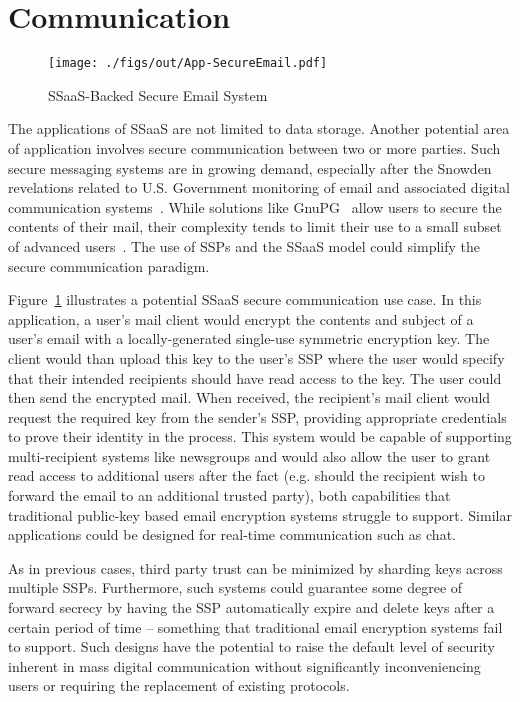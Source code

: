 \section{Communication}

\begin{figure}[t]
  \centering
  \texttt{[image: ./figs/out/App-SecureEmail.pdf]}
  \caption{SSaaS-Backed Secure Email System}
  \label{fig:apps-secureemail}
\end{figure}

The applications of SSaaS are not limited to data storage. Another
potential area of application involves secure communication between
two or more parties. Such secure messaging systems are in growing
demand, especially after the Snowden revelations related to U.S.
Government monitoring of email and associated digital communication
systems~\cite{gellman-muscular, greenwald-collect,
  greenwald-prism}. While solutions like GnuPG~\cite{gnupg} allow
users to secure the contents of their mail, their complexity tends to
limit their use to a small subset of advanced
users~\cite{green-challenge, whitten1999}. The use of SSPs and the
SSaaS model could simplify the secure communication paradigm.

Figure~\ref{fig:apps-secureemail} illustrates a potential SSaaS secure
communication use case. In this application, a user's mail client
would encrypt the contents and subject of a user's email with a
locally-generated single-use symmetric encryption key. The client
would than upload this key to the user's SSP where the user would
specify that their intended recipients should have read access to the
key. The user could then send the encrypted mail. When received, the
recipient's mail client would request the required key from the
sender's SSP, providing appropriate credentials to prove their
identity in the process. This system would be capable of supporting
multi-recipient systems like newsgroups and would also allow the user
to grant read access to additional users after the fact (e.g. should
the recipient wish to forward the email to an additional trusted
party), both capabilities that traditional public-key based email
encryption systems struggle to support. Similar applications could be
designed for real-time communication such as chat.

As in previous cases, third party trust can be minimized by sharding
keys across multiple SSPs. Furthermore, such systems could guarantee
some degree of forward secrecy by having the SSP automatically expire
and delete keys after a certain period of time -- something that
traditional email encryption systems fail to support. Such designs
have the potential to raise the default level of security inherent in
mass digital communication without significantly inconveniencing users
or requiring the replacement of existing protocols.

